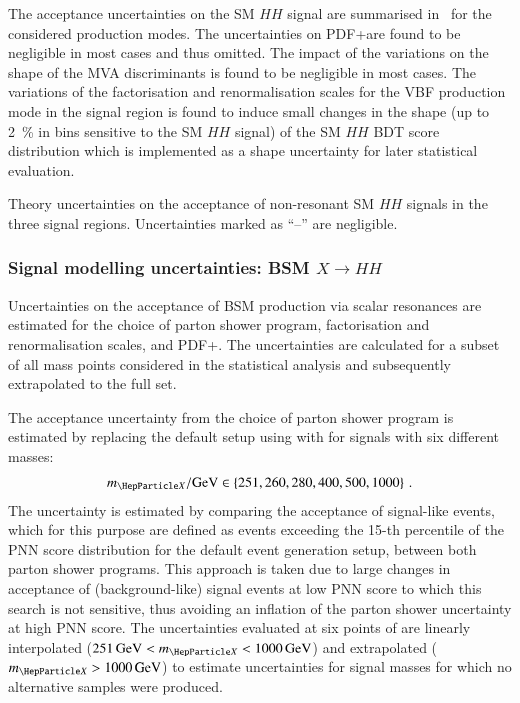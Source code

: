 The acceptance uncertainties on the SM $HH$ signal are summarised
in~ for the considered production
modes. The uncertainties on PDF+\alphas are found to be negligible in
most cases and thus omitted. The impact of the variations on the shape
of the MVA discriminants is found to be negligible in most cases. The
variations of the factorisation and renormalisation scales for the VBF
production mode in the \hadhad signal region is found to induce small
changes in the shape (up to \SI{2}{\percent} in bins sensitive to the
SM $HH$ signal) of the SM $HH$ BDT score distribution which is
implemented as a shape uncertainty for later statistical evaluation.

\begin{table}[htbp]
  \centering

  

  \caption{Theory uncertainties on the acceptance of non-resonant SM
    $HH$ signals in the three signal regions. Uncertainties marked as
    ``--'' are negligible.}
  \label{tab:theory_uncertainty_signal}
\end{table}


\subsubsection{Signal modelling uncertainties: BSM $X \to HH$}

Uncertainties on the acceptance of BSM \HH production via scalar
resonances are estimated for the choice of parton shower program,
factorisation and renormalisation scales, and PDF+\alphas. The
uncertainties are calculated for a subset of all mass points
considered in the statistical analysis and subsequently extrapolated
to the full set.


The acceptance uncertainty from the choice of parton shower program is
estimated by replacing the default setup using \HERWIG[7.1.3] with
\PYTHIA[8.235] for signals with six different masses:
\begin{align*}
  \mX / \si{\GeV} \in \left\{ 251, 260, 280, 400, 500, 1000
\right\} \,\text{.}
\end{align*}
The uncertainty is estimated by comparing the acceptance of
signal-like events, which for this purpose are defined as events
exceeding the 15-th percentile of the PNN score distribution for the
default event generation setup, between both parton shower
programs. This approach is taken due to large changes in acceptance of
(background-like) signal events at low PNN score to which this search
is not sensitive, thus avoiding an inflation of the parton shower
uncertainty at high PNN score. The uncertainties evaluated at six
points of \mX are linearly interpolated
($\SI{251}{\GeV} < \mX < \SI{1000}{\GeV}$) and extrapolated
($\mX > \SI{1000}{\GeV}$) to estimate uncertainties for signal masses
for which no alternative samples were produced.


